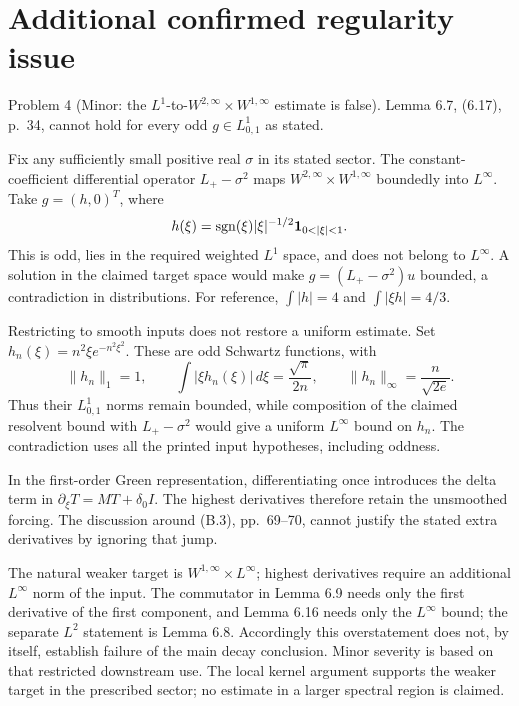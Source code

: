 \documentclass[10pt]{article}
\begin{document}
\section*{Additional confirmed regularity issue}
Problem 4 (Minor: the \(L^1\)-to-\(W^{2,\infty}\times W^{1,\infty}\) estimate is false).  Lemma 6.7, (6.17), p. 34, cannot hold for every odd \(g\in L^1_{0,1}\) as stated.\par
Fix any sufficiently small positive real \(\sigma\) in its stated sector. The constant-coefficient differential operator \(L_+-\sigma^2\) maps \(W^{2,\infty}\times W^{1,\infty}\) boundedly into \(L^\infty\). Take \(g=(h,0)^T\), where \[h(\xi)=\operatorname{sgn}(\xi)|\xi|^{-1/2}
                 {\bf1}_{0<|\xi|<1}.\] This is odd, lies in the required weighted \(L^1\) space, and does not belong to \(L^\infty\). A solution in the claimed target space would make \(g=(L_+-\sigma^2)u\) bounded, a contradiction in distributions. For reference, \(\int|h|=4\) and \(\int|\xi h|=4/3\).\par
Restricting to smooth inputs does not restore a uniform estimate. Set \(h_n(\xi)=n^2\xi e^{-n^2\xi^2}\). These are odd Schwartz functions, with \[\|h_n\|_1=1,\qquad
 \int|\xi h_n(\xi)|\,d\xi=\frac{\sqrt\pi}{2n},\qquad
 \|h_n\|_\infty=\frac{n}{\sqrt{2e}}.\] Thus their \(L^1_{0,1}\) norms remain bounded, while composition of the claimed resolvent bound with \(L_+-\sigma^2\) would give a uniform \(L^\infty\) bound on \(h_n\). The contradiction uses all the printed input hypotheses, including oddness.\par
In the first-order Green representation, differentiating once introduces the delta term in \(\partial_\xi T=MT+\delta_0 I\). The highest derivatives therefore retain the unsmoothed forcing. The discussion around (B.3), pp. 69–70, cannot justify the stated extra derivatives by ignoring that jump.\par
The natural weaker target is \(W^{1,\infty}\times L^\infty\); highest derivatives require an additional \(L^\infty\) norm of the input. The commutator in Lemma 6.9 needs only the first derivative of the first component, and Lemma 6.16 needs only the \(L^\infty\) bound; the separate \(L^2\) statement is Lemma 6.8. Accordingly this overstatement does not, by itself, establish failure of the main decay conclusion. Minor severity is based on that restricted downstream use. The local kernel argument supports the weaker target in the prescribed sector; no estimate in a larger spectral region is claimed.\par
\end{document}
